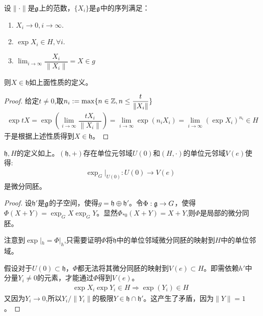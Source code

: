 \begin{proposition}
    设$\|\cdot\|$是$\mathfrak{g}$上的范数，$\{X_i\}$是$\mathfrak{g}$中的序列满足：
    \begin{enumerate}
        \item $X_i \to 0, i \to \infty$.
        \item $\exp X_i \in H,\forall i$.
        \item $\lim_{i \to \infty}\dfrac{X_i}{\|X_i\|}=X \in g$
    \end{enumerate}
    则$X \in \mathfrak{h}$如上面性质的定义。
\end{proposition}
\begin{proof}
    给定$t\neq 0$,取$n_i:=\max\{n \in \mathbb{Z},n\leq \dfrac{t}{\|X_i\|}\}$
    \begin{align}
        \exp tX=\exp(\lim_{i \to \infty}\dfrac{tX_i}{\|X_i\|})=\lim_{i \to \infty}\exp(n_iX_i)=\lim_{i \to \infty}(\exp X_i)^{n_i}\in H
    \end{align}
    于是根据上述性质得到$X \in \mathfrak{h}$。
\end{proof}
\begin{proposition}
    $\mathfrak{h},H$的定义如上。$(\mathfrak{h},+)$存在单位元邻域$U(0)$和$(H,\cdot)$的单位元邻域$V(e)$使得:
    \begin{align}
        \exp_{G}|_{U(0)}:U(0)\to V(e)
    \end{align}
    是微分同胚。
\end{proposition}
\begin{proof}
    设$\mathfrak{h}'$是$\mathfrak{g}$的子空间，使得$g=\mathfrak{h}\oplus \mathfrak{h}'
    $。令$\Phi:\mathfrak{g} \to G$，使得$\Phi(X+Y)=\exp_G X\exp_G Y$。显然$\Phi_{*0}(X+Y)=X+Y$,则$\Phi$是局部的微分同胚。

    注意到$\exp|_h=\Phi|_h$,只需要证明$\Phi$将$\mathfrak{h}$中的单位邻域微分同胚的映射到$H$中的单位邻域。

    假设对于$U(0)\subset \mathfrak{h}$，$\Phi$都无法将其微分同胚的映射到$V(e)\subset H$。即需依赖$h'$中分量$Y_i \neq 0$的元素，才能通过$\Phi$得到$V(e)$。
    \begin{align}
        \exp X_i \exp Y_i \in H \Rightarrow \exp(Y_i)\in H
    \end{align}
    又因为$Y_i \to 0$,所以$Y_i/\|Y_i\|$的极限$Y \in \mathfrak{h}\cap \mathfrak{h'}$。这产生了矛盾，因为$\| Y\|=1$。

\end{proof}

